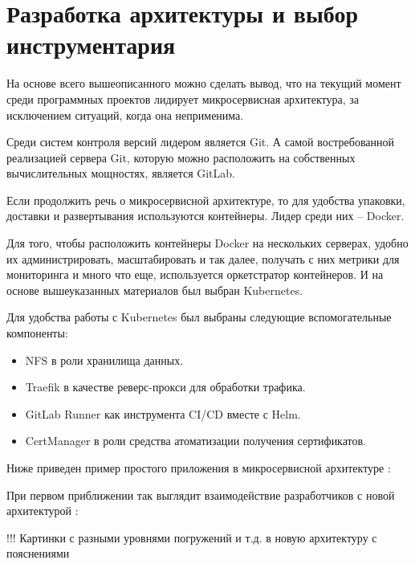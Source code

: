 \section{Разработка архитектуры и выбор инструментария}
\label{sec:tools}

На основе всего вышеописанного можно сделать вывод, что на текущий момент среди программных проектов лидирует микросервисная архитектура, за исключением ситуаций, когда она неприменима.

Среди систем контроля версий лидером является Git. А самой востребованной реализацией сервера Git, которую можно расположить на собственных вычислительных мощностях, является GitLab.

Если продолжить речь о микросервисной архитектуре, то для удобства упаковки, доставки и развертывания используются контейнеры. Лидер среди них -- Docker.

Для того, чтобы расположить контейнеры Docker на нескольких серверах, удобно их администрировать, масштабировать и так далее, получать с них метрики для мониторинга и много что еще, используется оркетстратор контейнеров. И на основе вышеуказанных материалов был выбран Kubernetes.

Для удобства работы с Kubernetes был выбраны следующие вспомогательные компоненты:
\begin{itemize}
    \item NFS в роли хранилища данных.
    \item Traefik в качестве реверс-прокси для обработки трафика.
    \item GitLab Runner как инструмента CI/CD вместе с Helm.
    \item CertManager в роли средства атоматизации получения сертификатов.
\end{itemize}

Ниже приведен пример простого приложения в микросервисной архитектуре :

При первом приближении так выглядит взаимодействие разработчиков с новой архитектурой :

!!! Картинки с разными уровнями погружений и т.д. в новую архитектуру с пояснениями

